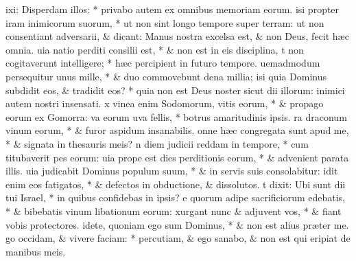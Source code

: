 \documentclass[letter,11pt]{book}
\begin{document}
\begin{multicols}{2}
ixi: Disperdam illos: * privabo autem ex omnibus memoriam eorum.
isi propter iram inimicorum suorum, * ut non sint longo tempore super terram: ut non consentiant adversarii, \& dicant: Manus nostra excelsa est, \& non Deus, fecit h\ae c omnia.
uia natio perditi consilii est, * \& non est in eis disciplina,
t non cogitaverunt intelligere; * h\ae c percipient in futuro tempore.
uemadmodum persequitur unus mille, * \& duo commovebunt dena millia;
isi quia Dominus subdidit eos, \& tradidit eos? * quia non est Deus noster sicut dii illorum: inimici autem nostri insensati.
x vinea enim Sodomorum, vitis eorum, * \& propago eorum ex Gomorra:
va eorum uva fellis, * botrus amaritudinis ipsis.
ra draconum vinum eorum, * \& furor aspidum insanabilis.
onne h\ae c congregata sunt apud me, * \& signata in thesauris meis?
n diem judicii reddam in tempore, * cum titubaverit pes eorum:
uia prope est dies perditionis eorum, * \& advenient parata illis.
uia judicabit Dominus populum suum, * \& in servis suis consolabitur:
idit enim eos fatigatos, * \& defectos in obductione, \& dissolutos.
t dixit: Ubi sunt dii tui Israel, * in quibus confidebas in ipsis?
e quorum adipe sacrificiorum edebatis, * \& bibebatis vinum libationum eorum:
xurgant nunc \& adjuvent vos, * \& fiant vobis protectores.
idete, quoniam ego sum Dominus, * \& non est alius pr\ae ter me.
go occidam, \& vivere faciam: * percutiam, \& ego sanabo, \& non est qui eripiat de manibus meis.

\end{multicols}
\end{document}
